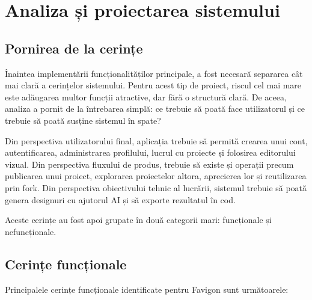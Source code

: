 \chapter{Analiza și proiectarea sistemului}

\section{Pornirea de la cerințe}

Înaintea implementării funcționalităților principale, a fost necesară separarea cât mai clară a cerințelor sistemului. Pentru acest tip de proiect, riscul cel mai mare este adăugarea multor funcții atractive, dar fără o structură clară. De aceea, analiza a pornit de la întrebarea simplă: ce trebuie să poată face utilizatorul și ce trebuie să poată susține sistemul în spate?

Din perspectiva utilizatorului final, aplicația trebuie să permită crearea unui cont, autentificarea, administrarea profilului, lucrul cu proiecte și folosirea editorului vizual. Din perspectiva fluxului de produs, trebuie să existe și operații precum publicarea unui proiect, explorarea proiectelor altora, aprecierea lor și reutilizarea prin fork. Din perspectiva obiectivului tehnic al lucrării, sistemul trebuie să poată genera designuri cu ajutorul AI și să exporte rezultatul în cod.

Aceste cerințe au fost apoi grupate în două categorii mari: funcționale și nefuncționale.

\section{Cerințe funcționale}

Principalele cerințe funcționale identificate pentru Favigon sunt următoarele:

